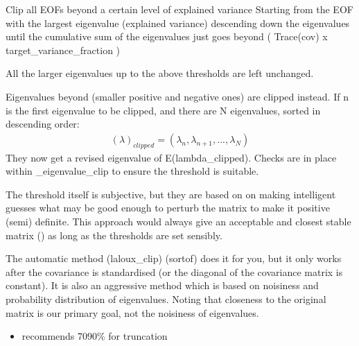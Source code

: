 \documentclass[letterpaper,10pt,english]{sphinxmanual}
\begin{document}
\begin{fulllineitems}
\label{\detokenize{misc:glomar_gridding.covariance_tools.explained_variance_clip}}
\pysigstartsignatures
\pysiglinewithargsret
{}
{\sphinxparamcomma {}}
{}
\pysigstopsignatures
\sphinxAtStartPar
Clip all EOFs beyond a certain level of explained variance
Starting from the EOF with the largest eigenvalue (explained variance)
descending down the eigenvalues until the cumulative sum of the
eigenvalues just goes beyond ( Trace(cov) x target\_variance\_fraction )

\sphinxAtStartPar
All the larger eigenvalues up to the above thresholds are left unchanged.

\sphinxAtStartPar
Eigenvalues beyond (smaller positive and negative ones) are clipped instead.
If n is the first eigenvalue to be clipped, and there are N eigenvalues,
sorted in descending order:
\begin{equation*}
\begin{split}(\lambda)_{clipped} = (\lambda_{n}, \lambda_{n+1}, ..., \lambda_{N})\end{split}
\end{equation*}
\sphinxAtStartPar
They now get a revised eigenvalue of E(lambda\_clipped).
Checks are in place within \_eigenvalue\_clip to ensure the
threshold is suitable.

\sphinxAtStartPar
The threshold itself is subjective, but they are based on
on making intelligent guesses what may be good enough to perturb
the matrix to make it positive (semi) definite. This approach
would always give an acceptable and closest stable matrix
() as long as the thresholds
are set sensibly.

\sphinxAtStartPar
The automatic method (laloux\_clip) (sort\sphinxhyphen{}of) does it for you,
but it only works after the covariance is standardised (or the
diagonal of the covariance matrix is constant). It is also an
aggressive method which is based on noisiness and probability
distribution of eigenvalues. Noting that closeness to the original
matrix is our primary goal, not the noisiness of eigenvalues.
\begin{itemize}
\item {}
\sphinxAtStartPar
{} recommends 70\sphinxhyphen{}90\% for truncation


\end{itemize}
\end{fulllineitems}
\end{document}
